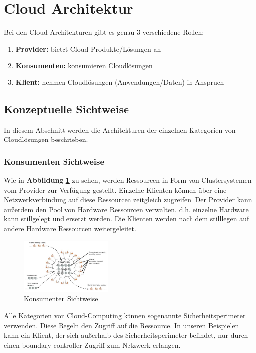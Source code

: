 \section{Cloud Architektur}

Bei den Cloud Architekturen gibt es genau 3 verschiedene Rollen:
\begin{enumerate}
	\item \textbf{Provider:} bietet Cloud Produkte/Lösungen an
	\item \textbf{Konsumenten:} konsumieren Cloudlösungen
	\item \textbf{Klient:} nehmen Cloudlösungen (Anwendungen/Daten) in Anspruch
\end{enumerate}

\subsection{Konzeptuelle Sichtweise}

In diesem Abschnitt werden die Architekturen der einzelnen Kategorien von Cloudlösungen beschrieben.

\subsubsection{Konsumenten Sichtweise}

Wie in \textbf{Abbildung \ref{ConsumerView}} zu sehen, werden Ressourcen in Form von Clustersystemen vom Provider zur Verfügung gestellt.
Einzelne Klienten können über eine Netzwerkverbindung auf diese Ressourcen zeitgleich zugreifen. Der Provider kann außerdem den Pool
von Hardware Ressourcen verwalten, d.h. einzelne Hardware kann stillgelegt und ersetzt werden. Die Klienten werden nach dem stilllegen
auf andere Hardware Ressourcen weitergeleitet.
\begin{figure}[H]
    \centering
	\includegraphics[width=0.4\textwidth]{Images/ConsumerView}
	\caption{Konsumenten Sichtweise \cite{Badger}}
	\label{ConsumerView}
\end{figure}


Alle Kategorien von Cloud-Computing können sogenannte Sicherheitsperimeter verwenden. Diese Regeln den Zugriff auf die Ressource.
In unseren Beispielen kann ein Klient, der sich außerhalb des Sicherheitsperimeter befindet, nur durch einen \glqq boundary controller\grqq
Zugriff zum Netzwerk erlangen.

